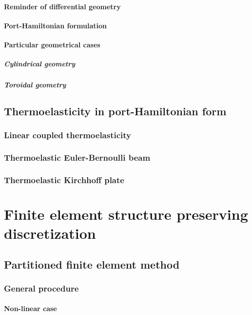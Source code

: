 \documentclass[a4paper,11pt]{book}
\begin{document}
\subsection{Reminder of differential geometry}
\subsection{Port-Hamiltonian formulation}
\subsection{Particular geometrical cases}
\subsubsection{Cylindrical geometry}
\subsubsection{Toroidal geometry}

\chapter{Thermoelasticity in port-Hamiltonian form}
\section{Linear coupled thermoelasticity}
\section{Thermoelastic Euler-Bernoulli beam}
\section{Thermoelastic Kirchhoff plate}

\part{Finite element structure preserving discretization}
\chapter{Partitioned finite element method}
\section{General procedure}
\subsection{Non-linear case}
\end{document}
